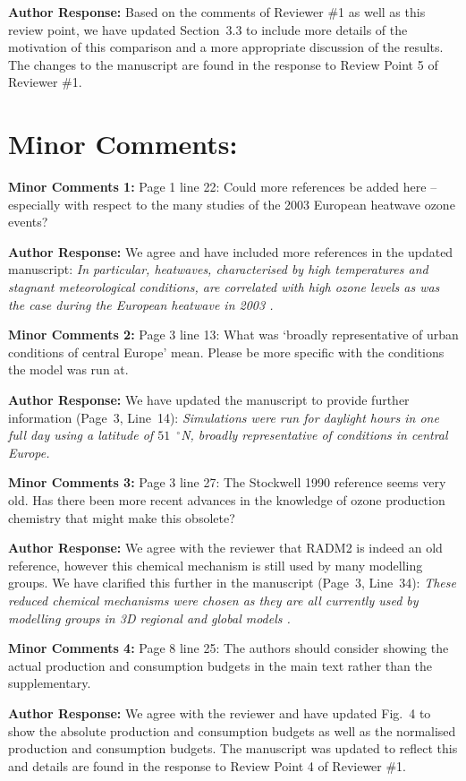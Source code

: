\documentclass{article}
\DeclareRobustCommand*\degree{\ensuremath{^{\circ}}}
\begin{document}
\textbf{Author Response:} Based on the comments of Reviewer \#1 as well as this review point, we have updated Section~3.3 to include more details of the motivation of this comparison and a more appropriate discussion of the results. The changes to the manuscript are found in the response to Review Point 5 of Reviewer \#1.

\section*{Minor Comments:}

\textbf{Minor Comments 1:} Page 1 line 22: Could more references be added here – especially with respect to the many studies of the 2003 European heatwave ozone events?

\textbf{Author Response:} We agree and have included more references in the updated manuscript:
\textit{
In particular, heatwaves, characterised by high temperatures and stagnant meteorological conditions, are correlated with high ozone levels as was the case during the European heatwave in 2003 \citep{Solberg:2008, Vautard:2005}.
} 

\textbf{Minor Comments 2:}  Page 3 line 13: What was ‘broadly representative of urban conditions of central Europe’ mean. Please be more specific with the conditions the model was run at.

\textbf{Author Response:} We have updated the manuscript to provide further information (Page~3, Line~14):
\textit{
Simulations were run for daylight hours in one full day using a latitude of $51$~\degree N, broadly representative of conditions in central Europe.
}

\textbf{Minor Comments 3:} Page 3 line 27: The Stockwell 1990 reference seems very old. Has there been more recent advances in the knowledge of ozone production chemistry that might make this obsolete?

\textbf{Author Response:} We agree with the reviewer that RADM2 is indeed an old reference, however this chemical mechanism is still used by many modelling groups. We have clarified this further in the manuscript (Page~3, Line~34):
\textit{
These reduced chemical mechanisms were chosen as they are all currently used by modelling groups in 3D regional and global models \citep{Baklanov:2014}.
}

\textbf{Minor Comments 4:}  Page 8 line 25: The authors should consider showing the actual production and consumption budgets in the main text rather than the supplementary.

\textbf{Author Response:} We agree with the reviewer and have updated Fig.~4 to show the absolute production and consumption budgets as well as the normalised production and consumption budgets. The manuscript was updated to reflect this and details are found in the response to Review Point 4 of Reviewer \#1.



\end{document}
